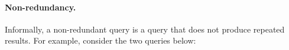 \iffalse
We formalize the latter with the following definition in Coq.
\begin{verbatim}
Definition is_a_grounded_typed_nf_query 
  (s : wfGraphQLSchema) (|$\query$| : query) :=
    are_in_ground_typed_nf s |$\query$|.(selection_set).
  \end{verbatim}
  \fi 

\iffalse
\begin{verbatim}
Lemma are_grounded_in_ground_typed_nf (s : wfGraphQLSchema)
                                      (type_in_scope : Name)
                                      (queries : seq Query) :
        are_grounded s type_in_scope queries ->
        are_in_ground_typed_nf s queries.
\end{verbatim}
\fi





\paragraph{Non-redundancy.}

Informally, 
a non-redundant query is a query that does not produce repeated results.
For example, consider the two queries below:

